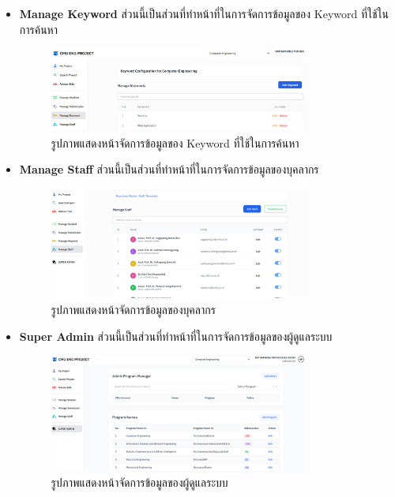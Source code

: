 \begin{itemize}
\item \textbf{Manage Keyword} ส่วนนี้เป็นส่วนที่ทำหน้าที่ในการจัดการข้อมูลของ Keyword ที่ใช้ในการค้นหา
\begin{figure}[H]
  \centering
  \includegraphics[width=0.8\textwidth]{pictures/project_box/manage_keyword.png}
  \caption{รูปภาพแสดงหน้าจัดการข้อมูลของ Keyword ที่ใช้ในการค้นหา}
  \label{fig:manage_keyword}
\end{figure}
\item \textbf{Manage Staff} ส่วนนี้เป็นส่วนที่ทำหน้าที่ในการจัดการข้อมูลของบุคลากร
\begin{figure}[H]
  \centering
  \includegraphics[width=0.8\textwidth]{pictures/project_box/manage_staff.png}
  \caption{รูปภาพแสดงหน้าจัดการข้อมูลของบุคลากร}
  \label{fig:manage_staff}
\end{figure}
\item \textbf{Super Admin} ส่วนนี้เป็นส่วนที่ทำหน้าที่ในการจัดการข้อมูลของผู้ดูแลระบบ
\begin{figure}[H]
  \centering
  \includegraphics[width=0.8\textwidth]{pictures/project_box/super_admin.png}
  \caption{รูปภาพแสดงหน้าจัดการข้อมูลของผู้ดูแลระบบ}
  \label{fig:super_admin}
  
\end{figure}
\end{itemize}

